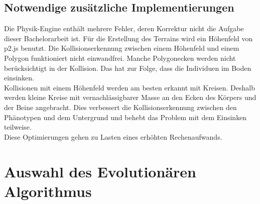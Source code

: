     \subsection{Notwendige zusätzliche Implementierungen}

      Die Physik-Engine enthält mehrere Fehler, deren Korrektur nicht die Aufgabe dieser Bachelorarbeit ist.
      Für die Erstellung des Terrains wird ein Höhenfeld von p2.js benutzt.
      Die Kollisionserkennung zwischen einem Höhenfeld und einem Polygon funktioniert nicht einwandfrei.
      Manche Polygonecken werden nicht berücksichtigt in der Kollision.
      Das hat zur Folge, dass die Individuen im Boden einsinken.
      \\
      Kollisionen mit einem Höhenfeld werden am besten erkannt mit Kreisen.
      Deshalb werden kleine Kreise mit vernachlässigbarer Masse an den Ecken des Körpers und der Beine angebracht.
      Dies verbessert die Kollisionserkennung zwischen den Phänotypen und dem Untergrund
      und behebt das Problem mit dem Einsinken teilweise.
      \\
      Diese Optimierungen gehen zu Lasten eines erhöhten Rechenaufwands.

  \section{Auswahl des Evolutionären Algorithmus}


